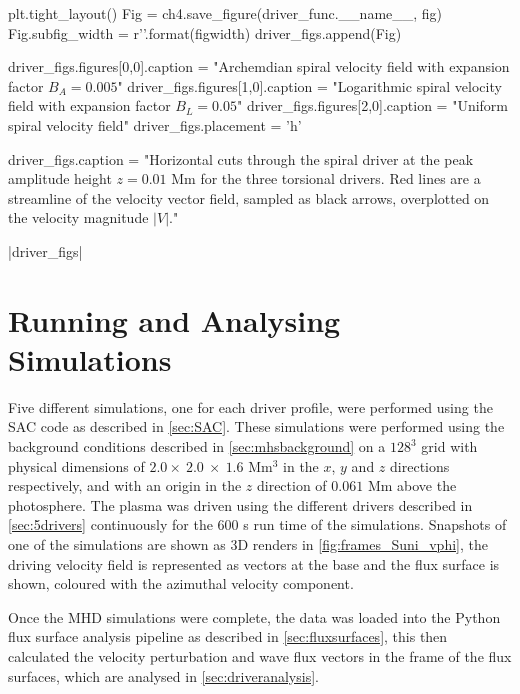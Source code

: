 \begin{pycode}[chapter4]
    plt.tight_layout()
    Fig = ch4.save_figure(driver_func.__name__, fig)
    Fig.subfig_width = r'{}\columnwidth'.format(figwidth)
    driver_figs.append(Fig)

driver_figs.figures[0,0].caption = "Archemdian spiral velocity field with expansion factor $B_A=0.005$"
driver_figs.figures[1,0].caption = "Logarithmic spiral velocity field with expansion factor $B_L=0.05$"
driver_figs.figures[2,0].caption = "Uniform spiral velocity field"
driver_figs.placement = 'h'

driver_figs.caption = "Horizontal cuts through the spiral driver at the peak amplitude height $z = 0.01$ Mm for the three torsional drivers. Red lines are a streamline of the velocity vector field, sampled as black arrows, overplotted on the velocity magnitude $|V|$."
\end{pycode}

\py[chapter4]|driver_figs|

\section{Running and Analysing Simulations}

Five different simulations, one for each driver profile, were performed using the SAC code as described in \cref{sec:SAC}.
These simulations were performed using the background conditions described in \cref{sec:mhsbackground} on a $128^3$ grid with physical dimensions of $2.0 \times\ 2.0\ \times\ 1.6$ Mm$^3$ in the $x$, $y$ and $z$ directions respectively, and with an origin in the $z$ direction of $0.061$ Mm above the photosphere.
The plasma was driven using the different drivers described in \cref{sec:5drivers} continuously for the $600$ s run time of the simulations.
Snapshots of one of the simulations are shown as 3D renders in \cref{fig:frames_Suni_vphi}, the driving velocity field is represented as vectors at the base and the flux surface is shown, coloured with the azimuthal velocity component.

Once the MHD simulations were complete, the data was loaded into the Python flux surface analysis pipeline as described in \cref{sec:fluxsurfaces}, this then calculated the velocity perturbation and wave flux vectors in the frame of the flux surfaces, which are analysed in \cref{sec:driveranalysis}.

